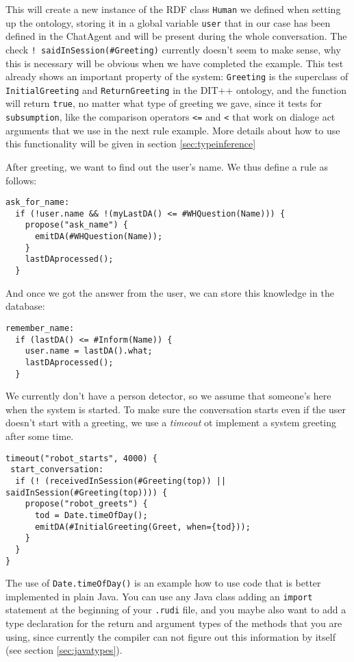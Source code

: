 This will create a new instance of the RDF class \texttt{Human} we defined when
setting up the ontology, storing it in a global variable \texttt{user} that in
our case has been defined in the ChatAgent and will be present during the whole
conversation. The check \texttt{!~saidInSession(\#Greeting)} currently doesn't
seem to make sense, why this is necessary will be obvious when we have
completed the example. This test already shows an important property of the
system: \texttt{Greeting} is the superclass of \texttt{InitialGreeting} and
\texttt{ReturnGreeting} in the DIT++ ontology, and the function will return
\texttt{true}, no matter what type of greeting we gave, since it tests for
\texttt{subsumption}, like the comparison operators \texttt{<=} and \texttt{<}
that work on dialoge act arguments that we use in the next rule example. More
details about how to use this functionality will be given in section
\ref{sec:typeinference}

After greeting, we want to find out the user's name. We thus define a rule as
follows:

\begin{lstlisting}
ask_for_name:
  if (!user.name && !(myLastDA() <= #WHQuestion(Name))) {
    propose("ask_name") {
      emitDA(#WHQuestion(Name));
    }
    lastDAprocessed();
  }
\end{lstlisting}

And once we got the answer from the user, we can store this knowledge in the
database:

\begin{lstlisting}
remember_name:
  if (lastDA() <= #Inform(Name)) {
    user.name = lastDA().what;
    lastDAprocessed();
  }
\end{lstlisting}

We currently don't have a person detector, so we assume that someone's here
when the system is started. To make sure the conversation starts even if the
user doesn't start with a greeting, we use a \emph{timeout} ot implement a
system greeting after some time.

\begin{lstlisting}
timeout("robot_starts", 4000) {
 start_conversation:
  if (! (receivedInSession(#Greeting(top)) || saidInSession(#Greeting(top)))) {
    propose("robot_greets") {
      tod = Date.timeOfDay();
      emitDA(#InitialGreeting(Greet, when={tod}));
    }
  }
}
\end{lstlisting}

The use of \texttt{Date.timeOfDay()} is an example how to use code
that is better implemented in plain Java. You can use any Java class
adding an \texttt{import} statement at the beginning of your
\texttt{.rudi} file, and you maybe also want to add a type declaration
for the return and argument types of the methods that you are using,
since currently the compiler can not figure out this information by
itself (see section \ref{sec:javatypes}).

